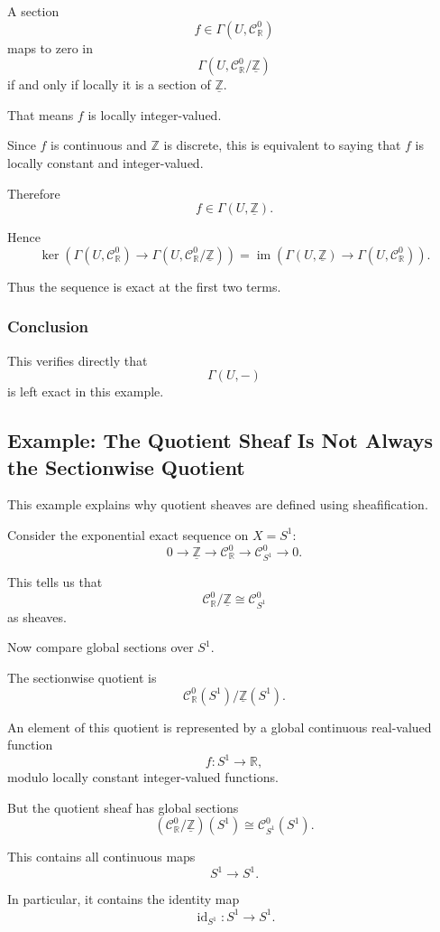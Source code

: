 \documentclass[12pt,a4paper]{article}
\DeclareMathOperator{\id}{id}
\DeclareMathOperator{\im}{im}
\newcommand{\RR}{\mathbb{R}}
\newcommand{\ZZ}{\mathbb{Z}}
\newcommand{\Czero}{\mathcal C^0}        %
\theoremstyle{notespace}
\newcommand{\SSone}{S^1}
\begin{document}
A section
\[
f\in \Gamma(U,\Czero_{\RR})
\]
maps to zero in
\[
\Gamma(U,\Czero_{\RR}/\underline{\ZZ})
\]
if and only if locally it is a section of \(\underline{\ZZ}\).

That means \(f\) is locally integer-valued.

Since \(f\) is continuous and \(\ZZ\) is discrete, this is equivalent to saying that \(f\) is locally constant and integer-valued.

Therefore
\[
f\in \Gamma(U,\underline{\ZZ}).
\]

Hence
\[
\ker\left(
\Gamma(U,\Czero_{\RR})
\to
\Gamma(U,\Czero_{\RR}/\underline{\ZZ})
\right)
=
\im\left(
\Gamma(U,\underline{\ZZ})
\to
\Gamma(U,\Czero_{\RR})
\right).
\]

Thus the sequence is exact at the first two terms.

\subsubsection*{Conclusion}

This verifies directly that
\[
\Gamma(U,-)
\]
is left exact in this example.

\subsection{Example: The Quotient Sheaf Is Not Always the Sectionwise Quotient}

This example explains why quotient sheaves are defined using sheafification.

Consider the exponential exact sequence on \(X=\SSone\):
\[
0\to \underline{\ZZ}
\to \Czero_{\RR}
\to \Czero_{\SSone}
\to 0.
\]

This tells us that
\[
\Czero_{\RR}/\underline{\ZZ}
\cong
\Czero_{\SSone}
\]
as sheaves.

Now compare global sections over \(\SSone\).

The sectionwise quotient is
\[
\Czero_{\RR}(\SSone)/\underline{\ZZ}(\SSone).
\]

An element of this quotient is represented by a global continuous real-valued function
\[
f:\SSone\to \RR,
\]
modulo locally constant integer-valued functions.

But the quotient sheaf has global sections
\[
(\Czero_{\RR}/\underline{\ZZ})(\SSone)
\cong
\Czero_{\SSone}(\SSone).
\]

This contains all continuous maps
\[
\SSone\to \SSone.
\]

In particular, it contains the identity map
\[
\id_{\SSone}:\SSone\to \SSone.
\]
\end{document}
